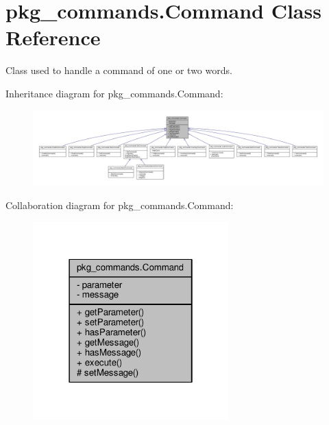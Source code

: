 \hypertarget{classpkg__commands_1_1Command}{\section{pkg\-\_\-commands.\-Command Class Reference}
\label{classpkg__commands_1_1Command}
}


Class used to handle a command of one or two words.  




Inheritance diagram for pkg\-\_\-commands.\-Command\-:\nopagebreak
\begin{figure}[H]
\begin{center}
\leavevmode
\includegraphics[width=350pt]{classpkg__commands_1_1Command__inherit__graph}
\end{center}
\end{figure}


Collaboration diagram for pkg\-\_\-commands.\-Command\-:\nopagebreak
\begin{figure}[H]
\begin{center}
\leavevmode
\includegraphics[width=214pt]{classpkg__commands_1_1Command__coll__graph}
\end{center}
\end{figure}
